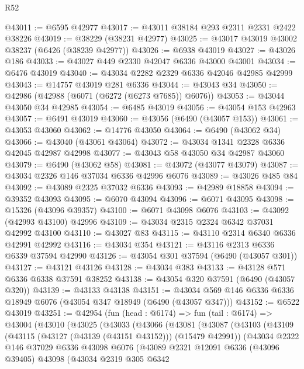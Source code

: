 \begin{lexlean}{R52}
\begin{coremodule}
@43011 := @6595 @42977
@43017 := @43011 @38184 @293 @2311 @2331 @2422 @38226
@43019 := @38229 (@38231 @42977)
@43025 := @43017 @43019 @43002 @38237 (@6426 (@38239 @42977))
@43026 := @6938 @43019
@43027 := @43026 @186
@43033 := @43027 @449 @2330 @42047 @6336 @43000 @43001
@43034 := @6476 @43019
@43040 := @43034 @2282 @2329 @6336 @42046 @42985 @42999
@43043 := @14757 @43019 @281 @6336
@43044 := @43043 @34
@43050 := @42986 (@42988 (@6071 (@6272 (@6273 @7685)) @6076))
@43053 := @43044 @43050 @34 @42985
@43054 := @6485 @43019
@43056 := @43054 @153 @42963
@43057 := @6491 @43019
@43060 := @43056 (@6490 (@43057 @153))
@43061 := @43053 @43060
@43062 := @14776 @43050
@43064 := @6490 (@43062 @34)
@43066 := @43040 (@43061 @43064)
@43072 := @43034 @1341 @2328 @6336 @42045 @42987 @42998
@43077 := @43043 @58 @43050 @34 @42987 @43060
@43079 := @6490 (@43062 @58)
@43081 := @43072 (@43077 @43079)
@43087 := @43034 @2326 @146 @37034 @6336 @42996 @6076
@43089 := @43026 @485 @84
@43092 := @43089 @2325 @37032 @6336
@43093 := @42989 @18858
@43094 := @39352 @43093
@43095 := @6070 @43094
@43096 := @6071 @43095
@43098 := @15326 (@43096 @39357)
@43100 := @6071 @43098 @6076
@43103 := @43092 (@42993 @43100) @42996
@43109 := @43034 @2315 @2324 @6342 @37031 @42992 @43100
@43110 := @43027 @83
@43115 := @43110 @2314 @6340 @6336 @42991 @42992
@43116 := @43034 @354
@43121 := @43116 @2313 @6336 @6339 @37594 @42990
@43126 := @43054 @301 @37594 (@6490 (@43057 @301))
@43127 := @43121 @43126
@43128 := @43034 @383
@43133 := @43128 @571 @6336 @6338 @37591 @38252
@43138 := @43054 @320 @37591 (@6490 (@43057 @320))
@43139 := @43133 @43138
@43151 := @43034 @569 @146 @6336 @6336 @18949 @6076 (@43054 @347 @18949 (@6490 (@43057 @347)))
@43152 := @6522 @43019
@43251 := @42954
    (fun (head : @6174) =>
    fun (tail : @6174) =>
    @43004
      (@43010
        (@43025
          (@43033
            (@43066
              (@43081
                (@43087
                  (@43103
                    (@43109
                      (@43115 (@43127 (@43139 (@43151 @43152))) (@15479 @42991))
                      (@43034
                        @2322
                        @146
                        @37029
                        @6336
                        @43098
                        @6076
                        (@43089
                          @2321
                          @12091
                          @6336
                          (@43096 @39405)
                          @43098
                          (@43034
                            @2319
                            @305
                            @6342

\end{coremodule}
\end{lexlean}
